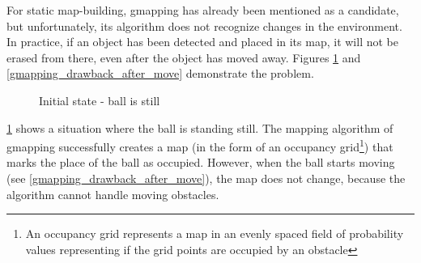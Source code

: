 For static map-building, gmapping has already been mentioned as a candidate, but unfortunately, its algorithm does not recognize changes in the environment. In practice, if an object has been detected and placed in its map, it will not be erased from there, even after the object has moved away. Figures \ref{gmapping_drawback_before_move} and \ref{gmapping_drawback_after_move} demonstrate the problem.

\begin{figure}[!ht]
    \centering
    \caption{Initial state - ball is still}
    \label{gmapping_drawback_before_move}
\end{figure}

\ref{gmapping_drawback_before_move} shows a situation where the ball is standing still. The mapping algorithm of gmapping successfully creates a map (in the form of an occupancy grid\footnote{An occupancy grid represents a map in an evenly spaced field of probability values representing if the grid points are occupied by an obstacle}) that marks the place of the ball as occupied. However, when the ball starts moving (see \ref{gmapping_drawback_after_move}), the map does not change, because the algorithm cannot handle moving obstacles.

